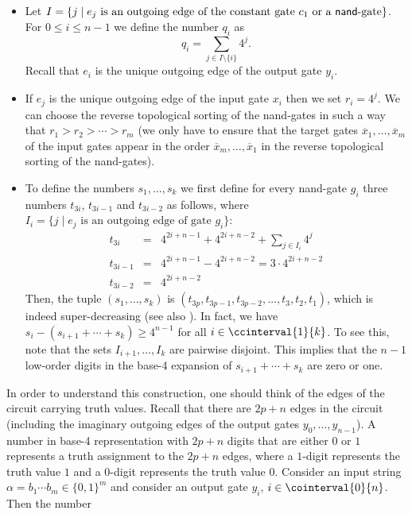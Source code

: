 \begin{itemize}
\item
Let $I = \{ j \mid e_j \text{ is an outgoing edge of the constant gate  $c_1$ or a {\sf nand}-gate} \}$.
For $0 \leq i \leq n-1$ we define the number $q_{i}$ as 
$$
q_{i} = \sum_{j \in I \setminus \{i\}} 4^j .
$$
Recall that $e_i$ is the unique outgoing edge of the output gate $y_i$.
\item If $e_j$ is the unique outgoing edge of the input gate $x_i$ then we set $r_i = 4^j$. We can choose the reverse
topological sorting of the {\sf nand}-gates in such a way that $r_1 > r_2 > \cdots > r_m$ (we only have to ensure that the target
gates $\overline{x}_1, \ldots, \overline{x}_m$ of the input gates appear in the order $\overline{x}_m, \ldots, \overline{x}_1$ in the 
reverse topological sorting of the {\sf nand}-gates).
\item To define the numbers $s_1, \ldots, s_k$ we first define for every {\sf nand}-gate $g_i$
three numbers $t_{3i}$, $t_{3i-1}$ and $t_{3i-2}$ as follows, where 
$I_i = \{ j \mid e_j \text{ is an outgoing edge of gate } g_i \}$:
\begin{eqnarray*}
t_{3i}       &=& 4^{2i+n-1} + 4^{2i+n-2} + \sum_{j \in I_i} 4^j \\
t_{3i-1} &=& 4^{2i+n-1} - 4^{2i+n-2} = 3 \cdot 4^{2i+n-2} \\
t_{3i-2}    &=& 4^{2i+n-2}   
\end{eqnarray*}
Then, the tuple $(s_1,\ldots, s_k)$ is $(t_{3p}, t_{3p-1}, t_{3p-2}, \ldots, t_3, t_2, t_1)$, which is indeed
super-decreasing (see also \cite{ref30}). In fact, we have $s_i - (s_{i+1} + \cdots + s_k) \geq 4^{n-1}$ for all $i \in \ccinterval{1}{k}$.
To see this, note that the sets $I_{i+1},\ldots, I_k$ are pairwise disjoint.  This implies that the $n-1$ low-order digits in the base-4 expansion of 
$s_{i+1} + \cdots + s_k$ are zero or one.

\end{itemize}
In order to understand this construction, one should think of the edges of the circuit carrying truth values.
Recall that there are $2p+n$ edges in the circuit (including the imaginary outgoing edges of the output gates
$y_0, \ldots, y_{n-1}$). 
A number in base-4 representation with $2p+n$ digits that are either $0$ or $1$ represents a truth assignment to the $2p+n$ edges,
where a $1$-digit represents the truth value $1$ and a $0$-digit represents the truth value $0$.
Consider  an input string $\alpha = b_1 \cdots b_m \in \{0,1\}^m$  and 
consider an output gate $y_i$, $i \in \cointerval{0}{n}$. Then the number

